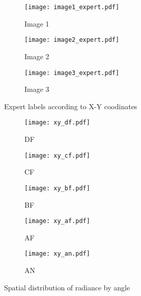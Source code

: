 \documentclass[11pt]{article}
\begin{document}
\begin{figure}[!h]
\begin{subfigure}{.33\linewidth}
  \centering
  \texttt{[image: image1\_expert.pdf]}
  \caption{Image 1}
  \label{fig:sfig1}
\end{subfigure}%
\begin{subfigure}{.33\linewidth}
  \centering
  \texttt{[image: image2\_expert.pdf]}
  \caption{Image 2}
  \label{fig:sfig2}
\end{subfigure}%
\begin{subfigure}{.33\linewidth}
  \centering
  \texttt{[image: image3\_expert.pdf]}
  \caption{Image 3}
  \label{fig:sfig2}
\end{subfigure}
\caption{Expert labels according to X-Y coodinates}
\label{fig:fig}
\end{figure}

\begin{figure}[!h]
\begin{subfigure}{.33\linewidth}
  \centering
  \texttt{[image: xy\_df.pdf]}
  \caption{DF}
  \label{fig:sfig1}
\end{subfigure}%
\begin{subfigure}{.33\linewidth}
  \centering
  \texttt{[image: xy\_cf.pdf]}
  \caption{CF}
  \label{fig:sfig2}%
\end{subfigure}
\begin{subfigure}{.33\linewidth}
  \centering
  \texttt{[image: xy\_bf.pdf]}
  \caption{BF}
  \label{fig:sfig2}
\end{subfigure}

\begin{subfigure}{.5\linewidth}
  \centering
  \texttt{[image: xy\_af.pdf]}
  \caption{AF}
  \label{fig:sfig1}
\end{subfigure}%
\begin{subfigure}{.5\linewidth}
  \centering
  \texttt{[image: xy\_an.pdf]}
  \caption{AN}
  \label{fig:sfig2}
\end{subfigure}
\caption{Spatial distribution of radiance by angle}
\label{fig:fig}
\end{figure}
\end{document}
